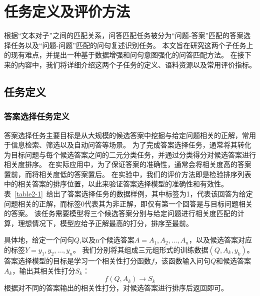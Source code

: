 \chapter{任务定义及评价方法}

根据“文本对子”之间的匹配关系，问答匹配任务被分为“问题-答案”匹配的答案选择任务以及“问题-问题”匹配的问句复述识别任务。
本文旨在研究这两个子任务上的现有难点，并提出一种基于数据增强和问句意图强化的问答匹配方法。
在接下来的内容中，我们将详细介绍这两个子任务的定义、语料资源以及常用评价指标。

\section{任务定义}

\subsection{答案选择任务定义}

答案选择任务主要目标是从大规模的候选答案中挖掘与给定问题相关的正解，常用于信息检索、筛选以及自动问答等场景。
为了完成答案选择任务，通常将其转化为目标问题与每个候选答案之间的二元分类任务，并通过分类得分对候选答案进行相关度排序。
在实际应用中，为了保证答案的准确性，通常会将相关度高的答案置前，而将相关度低的答案置后。
在实验中，我们的评价方法即是检验排序列表中的相关答案的排序位置，以此来验证答案选择模型的准确性和有效性。
表~\ref{table2-1}~给出了答案选择任务的数据样例，其中标签为1，代表该回答为给定问题相关的正解，而标签0代表其为非正解，即仅有第一个回答是与目标问题相关的答案。
该任务需要模型将三个候选答案分别与给定问题进行相关度匹配的计算，理想情况下，模型应给予正解最高的打分，排序至最前。

具体地，给定一个问句$Q$,以及n个候选答案$A={A_1, A_2,..., A_n}$，以及候选答案对应的标签$Y={y_1, y_2,..., y_n}$。
我们分别将其组成三元组形式的训练数据$(Q, A_k, y_k)$。
答案选择模型的目标是学习一个相关性打分函数$f$，该函数输入问句$Q$和候选答案$A_k$，输出其相关性打分$S_k$：
\begin{equation}
    f(Q, A_k) \rightarrow S_k
\end{equation}
根据对不同的答案输出的相关性打分，对候选答案进行排序后返回即可。

